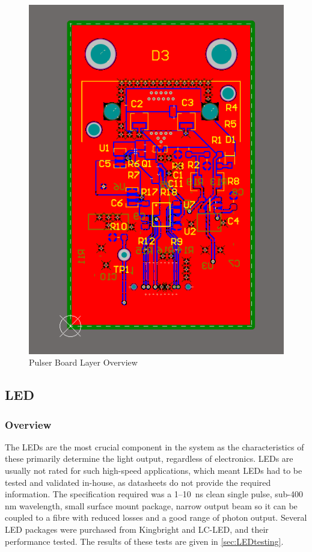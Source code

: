 \documentclass[a4paper,11pt]{article}
\begin{document}
\begin{figure}[htbp]
\centering
\includegraphics[scale=0.5]{PulserBoard0.9Overview.png}
\caption{Pulser Board Layer Overview\label{fig:PulserBoard0.9Overview}}
\end{figure}

\subsection{LED}

\subsubsection{Overview}

The LEDs are the most crucial component in the system as the characteristics of these primarily determine the light output, regardless of electronics. LEDs are usually not rated for such high-speed applications, which meant LEDs had to be tested and validated in-house, as datasheets do not provide the required information. The specification required was a 1--10~ns clean single pulse, sub-400 nm wavelength, small surface mount package, narrow output beam so it can be coupled to a fibre with reduced losses and a good range of photon output. Several LED packages were purchased from Kingbright and LC-LED, and their performance tested. The results of these tests are given in \cref{sec:LEDtesting}.
\end{document}

